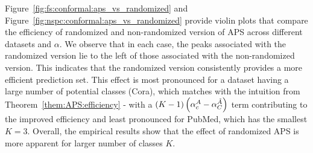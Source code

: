 Figure~\ref{fig:fs:conformal:aps_vs_randomized} and Figure~\ref{fig:nspc:conformal:aps_vs_randomized} provide violin plots that compare the efficiency of randomized and non-randomized version of APS across different datasets and $\alpha$.
We observe that in each case, the peaks associated with the randomized version lie to the left of those associated with the non-randomized version.
This indicates that the randomized version consistently provides a more efficient prediction set.
This effect is most pronounced for a dataset having a large number of potential classes (Cora), which matches with the intuition from Theorem~\ref{them:APS:efficiency} - with a $(K-1)\left(\alpha_c^{A} - \alpha_C^{\Tilde{A}}\right)$ term contributing to the improved efficiency and least pronounced for PubMed, which has the smallest $K=3$.
Overall, the empirical results show that the effect of randomized APS is more apparent for larger number of classes $K$.

